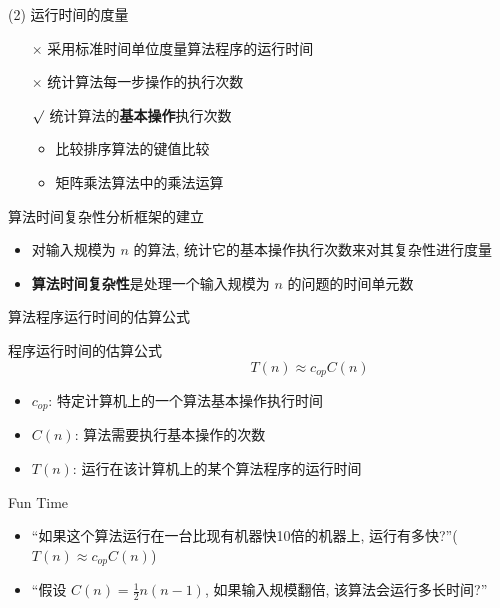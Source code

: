 \documentclass[fontset=fandol,UTF8,12pt,aspectratio=169,fleqn]{beamer}
\begin{document}
\begin{frame}{(2) 运行时间的度量}
\begin{itemize}[<+-|alert@+>]
 \item[$\times$] 采用标准时间单位度量算法程序的运行时间  
 \item[$\times$] 统计算法每一步操作的执行次数  
 \item[$\surd$] 统计算法的\textbf{基本操作}执行次数  
   \begin{itemize}[<+-|alert@+>]
   \item 比较排序算法的键值比较  
   \item 矩阵乘法算法中的乘法运算  
   \end{itemize}
\end{itemize}
\end{frame}

\begin{frame}{算法时间复杂性分析框架的建立}
\begin{itemize}[<+-|alert@+>]
\item 对输入规模为 $n$ 的算法, 统计它的基本操作执行次数来对其复杂性进行度量  
\item \textbf{算法时间复杂性}是处理一个输入规模为 $n$ 的问题的时间单元数  
\end{itemize}
\end{frame}

\begin{frame}{算法程序运行时间的估算公式}
    \begin{exampleblock}{程序运行时间的估算公式} %
      \begin{equation*}
        \hspace{3cm}        T(n) \approx c_{op}C(n)
  \end{equation*}
\end{exampleblock}   
\begin{itemize}[<+-|alert@+>]
\item $c_{op}$: 特定计算机上的一个算法基本操作执行时间  
\item $C(n)$: 算法需要执行基本操作的次数  
\item $T(n)$: 运行在该计算机上的某个算法程序的运行时间 
\end{itemize}
\end{frame}

\begin{frame}{Fun Time}
\begin{itemize}[<+-|alert@+>]
\item ``如果这个算法运行在一台比现有机器快10倍的机器上, 运行有多快?''($  T(n) \approx c_{op}C(n)$)  
\item ``假设 $C(n)=\frac{1}{2}n(n-1)$, 如果输入规模翻倍, 该算法会运行多长时间?''  
\end{itemize}
\end{frame}
\end{document}
